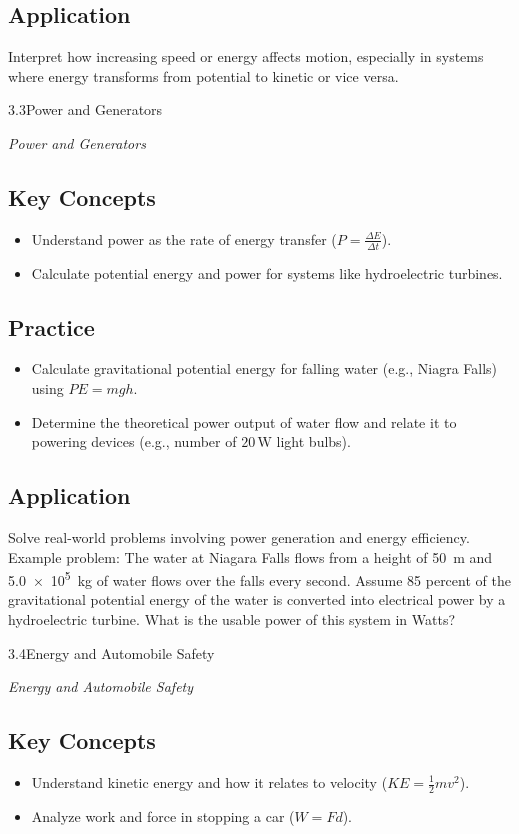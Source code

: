 \documentclass[11pt,addpoints,letterpaper]{exam}
\newcommand{\standardBox}[2]{%
    \begin{learningStandardBox}{#1}{#2} %
        \begin{minipage}[t]{0.5\textwidth} %
            \textit{#2} %
        \end{minipage}%
        \hfill
        \begin{minipage}[t]{0.25\textwidth} %
        \end{minipage}%
        \hfill
        \begin{minipage}[t]{0.2\textwidth} %
            \textbf{} \phantom{1.2cm}
        \end{minipage}
    \end{learningStandardBox}
}
\begin{document}
\subsection*{Application}
Interpret how increasing speed or energy affects motion, especially in systems where energy transforms from potential to kinetic or vice versa.

\pagebreak
\standardBox{3.3}{Power and Generators}
\subsection*{Key Concepts}
\begin{itemize}
    \item Understand power as the rate of energy transfer ($P = \frac{\Delta E}{\Delta t}$).
    \item Calculate potential energy and power for systems like hydroelectric turbines.
\end{itemize}

\subsection*{Practice}
\begin{itemize}
    \item Calculate gravitational potential energy for falling water (e.g., Niagra Falls) using $PE = mgh$.
    \item Determine the theoretical power output of water flow and relate it to powering devices (e.g., number of $20\,\mathrm{W}$ light bulbs).
\end{itemize}

\subsection*{Application}
Solve real-world problems involving power generation and energy efficiency. Example problem: The water at Niagara Falls flows from a height of \SI{50}{m} and \SI{5.0e5}{kg} of water flows over the falls every second. Assume 85 percent of the gravitational potential energy of the water is converted into electrical power by a hydroelectric turbine. What is the usable power of this system in Watts?



\pagebreak
\standardBox{3.4}{Energy and Automobile Safety}
\subsection*{Key Concepts}
\begin{itemize}
    \item Understand kinetic energy and how it relates to velocity ($KE = \frac{1}{2}mv^2$).
    \item Analyze work and force in stopping a car ($W = Fd$).
\end{itemize}
\end{document}
